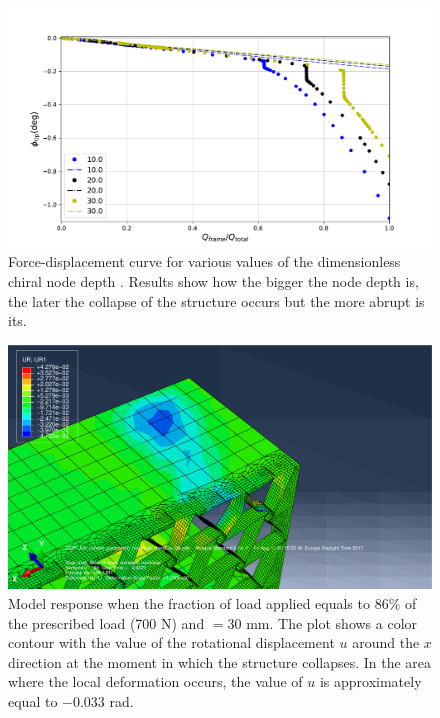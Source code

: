       \begin{figure}[!htpb] %
        \centering
        \includegraphics[width=0.8 \textwidth]{../figures/result-sim/B/force_displacement-far}
        \caption[Force-displacement curve for various values of the dimensionless chiral node depth]{Force-displacement curve for various values of the dimensionless chiral node depth \chiB. Results show how the bigger the node depth \chiB is, the later the collapse of the structure occurs but the more abrupt is its.}\label{fig:forceDisplacement-far-B}
      \end{figure}

      \begin{figure}[!htpb] %
        \centering
        \includegraphics[width=0.8 \textwidth]{../figures/result-sim/B/30_UR1}
        \caption[Model response when the fraction of load applied equals to 86\% of the prescribed load (700 N) and \chiB$= 30$ mm]{Model response when the fraction of load applied equals to 86\% of the prescribed load (700 N) and \chiB$= 30$ mm. The plot shows a color contour with the value of the rotational displacement $u$ around the $x$ direction at the moment in which the structure collapses. In the area where the local deformation occurs, the value of $u$ is approximately equal to $-0.033$ rad.}
        \label{fig:30_UR1}
      \end{figure}

